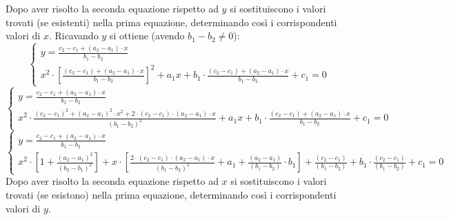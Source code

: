 \documentclass[12pt]{book}
\begin{document}
			Dopo aver risolto la seconda equazione rispetto ad $y$ si sostituiscono i valori trovati (se esistenti) nella prima equazione, determinando così i corrispondenti valori di $x$.
			Ricavando $y$ si ottiene (avendo $b_1-b_2\neq0$):
			$$\begin{cases}
				y=\frac{c_2-c_1+\left(a_2-a_1\right)\cdot x}
				{b_1-b_2}\\
				x^2\cdot\left[\frac{\left(c_2-c_1\right)+\left(a_2-a_1\right)\cdot x}
				{b_1-b_2}\right]^2
				+a_1x+b_1\cdot\frac{\left(c_2-c_1\right)+\left(a_2-a_1\right)\cdot x}
				{b_1-b_2}+c_1=0
			\end{cases}$$
			$$\begin{cases}
				y=\frac{c_2-c_1+\left(a_2-a_1\right)\cdot x}
				{b_1-b_2}\\
				x^2\cdot\frac{\left(c_2-c_1\right)^2+\left(a_2-a_1\right)^2\cdot x^2+2\cdot\left(c_2-c_1\right)\cdot\left(a_2-a_1\right)\cdot x}
				{\left(b_1-b_2\right)^2}
				+a_1x+b_1\cdot\frac{\left(c_2-c_1\right)+\left(a_2-a_1\right)\cdot x}
				{b_1-b_2}+c_1=0
			\end{cases}$$
			$$\begin{cases}
				y=\frac{c_2-c_1+\left(a_2-a_1\right)\cdot x}
				{b_1-b_2}\\
				x^2\cdot\left[1+\frac{\left(a_2-a_1\right)^2}
				{\left(b_2-b_1\right)^2}\right]
				+x\cdot\left[\frac{2\cdot\left(c_2-c_1\right)\cdot\left(a_2-a_1\right)\cdot x}
				{\left(b_1-b_2\right)^2}
				+a_1+\frac{\left(a_2-a_1\right)}
				{\left(b_1-b_2\right)}\cdot b_1\right]
				+\frac{\left(c_2-c_1\right)}
				{\left(b_1-b_2\right)}+b_1\cdot
				\frac{\left(c_2-c_1\right)}
				{\left(b_1-b_2\right)} +c_1=0
			\end{cases}$$
			Dopo aver risolto la seconda equazione rispetto ad $x$ si sostituiscono i valori trovati (se esistono) nella prima equazione, determinando così i corrispondenti valori di $y$.
			
\end{document}
